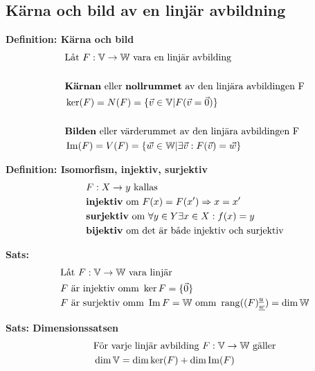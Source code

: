 \begin{multicols}{2}


\section{Kärna och bild av en linjär avbildning}

\textbf{Definition: Kärna och bild}
\begin{align*}
  &\quad  \text{Låt $F:\mathbb{V}\to\mathbb{W}$ vara en linjär avbilding} \\
  &\quad  \\
  &\quad  \text{\textbf{Kärnan} eller \textbf{nollrummet} av den linjära avbildingen F} \\
  &\quad  \ker(F) = N(F) = \{\vec{v}\in\mathbb{V} | F(\vec{v} = \vec{0})\} \\
  &\quad  \\
  &\quad  \text{\textbf{Bilden} eller \text{värderummet} av den linjära avbildingen F} \\
  &\quad  \operatorname{Im}(F) = V(F) = \{\vec{w}\in\mathbb{W} | \exists\vec{v}:F(\vec{v})=\vec{w}\} \\
\end{align*}

\textbf{Definition: Isomorfism, injektiv, surjektiv }
\begin{align*}
  &\quad  F:X\to{y} \text{ kallas} \\
  &\quad  \text{\textbf{injektiv} om } F(x) = F(x') \Rightarrow x = x' \\
  &\quad  \text{\textbf{surjektiv} om } \forall{y}\in Y\exists{x}\in{X}:f(x)=y \\
  &\quad  \text{\textbf{bijektiv} om det är både injektiv och surjektiv} 
\end{align*}

\textbf{Sats:}
\begin{align*}
  &\quad  \text{Låt $F:\mathbb{V}\to\mathbb{W}$ vara linjär} \\
  &\quad  F \text{ är injektiv omm } \ker{F} = \{\vec{0}\} \\
  &\quad  F \text{ är surjektiv omm } \operatorname{Im}{F} = \mathbb{W} \text{ omm }
  \operatorname{rang} ({(F)}^{\underline{u}}_{\underline{w}}) = \dim{\mathbb{W}} \\
\end{align*}


\textbf{Sats: Dimensionssatsen}
\begin{align*}
  &\quad  \text{För varje linjär avbilding $F:\mathbb{V}\to\mathbb{W}$ gäller} \\
  &\quad  \dim{\mathbb{V}} = \dim{\ker(F)} + \dim{\operatorname{Im}(F)}  \\
\end{align*}


\end{multicols}

